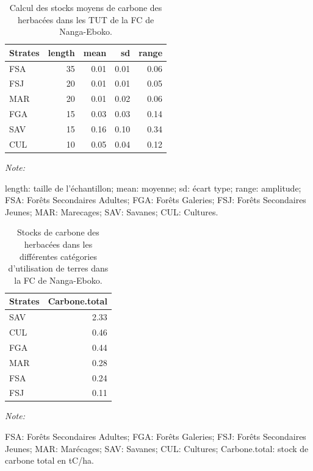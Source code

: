\documentclass[
  12pt,
  a4paper,
  extrafontsizes,
  onecolumn,
  openright]{book}
\theoremstyle{definition}
\theoremstyle{definition}
\theoremstyle{definition}
\theoremstyle{definition}
\theoremstyle{remark}
\begin{document}
\begin{table}[H]
\centering
\caption{\label{tab:StocksmoyensherbaceesFCNanga-Eboko3}Calcul des stocks moyens de carbone des herbacées dans les TUT de la FC de Nanga-Eboko.}
\centering
\begin{threeparttable}
\begin{tabular}[t]{lrrrr}
\toprule
Strates & length & mean & sd & range\\
\midrule
FSA & 35 & 0.01 & 0.01 & 0.06\\
FSJ & 20 & 0.01 & 0.01 & 0.05\\
MAR & 20 & 0.01 & 0.02 & 0.06\\
FGA & 15 & 0.03 & 0.03 & 0.14\\
SAV & 15 & 0.16 & 0.10 & 0.34\\
\addlinespace
CUL & 10 & 0.05 & 0.04 & 0.12\\
\bottomrule
\end{tabular}
\begin{tablenotes}
\item \textit{Note: } 
\item length: taille de l'échantillon; mean: moyenne; sd: écart type; range: amplitude; FSA: Forêts Secondaires Adultes; FGA: Forêts Galeries; FSJ: Forêts Secondaires Jeunes; MAR: Marecages; SAV: Savanes; CUL: Cultures.
\end{tablenotes}
\end{threeparttable}
\end{table}

\begin{table}[H]
\centering
\caption{\label{tab:StockscarboneherbaceesNanga-Eboko3}Stocks de carbone des herbacées dans les différentes catégories d'utilisation de terres dans la FC de Nanga-Eboko.}
\centering
\begin{threeparttable}
\begin{tabular}[t]{lr}
\toprule
Strates & Carbone.total\\
\midrule
SAV & 2.33\\
CUL & 0.46\\
FGA & 0.44\\
MAR & 0.28\\
FSA & 0.24\\
\addlinespace
FSJ & 0.11\\
\bottomrule
\end{tabular}
\begin{tablenotes}
\item \textit{Note: } 
\item FSA: Forêts Secondaires Adultes; FGA: Forêts Galeries; FSJ: Forêts Secondaires Jeunes; MAR: Marécages; SAV: Savanes; CUL: Cultures; Carbone.total: stock de carbone total en tC/ha.
\end{tablenotes}
\end{threeparttable}
\end{table}
\end{document}
